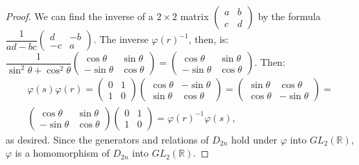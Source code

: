 \documentclass{article}
\begin{document}
\begin{enumerate}[label=(\alph*)]
\begin{proof}
            We can find the inverse of a $2 \times 2$ matrix $\begin{pmatrix}a & b \\ c & d\end{pmatrix}$ by the formula \newline $\dfrac{1}{ad - bc}\begin{pmatrix}d & -b \\ -c & a\end{pmatrix}$. The inverse $\varphi(r)^{-1}$, then, is: \newline $\dfrac{1}{\sin^2{\theta} + \cos^2{\theta}}\begin{pmatrix}\cos \theta & \sin \theta \\ -\sin \theta & \cos \theta\end{pmatrix} = \begin{pmatrix}\cos \theta & \sin \theta \\ -\sin \theta & \cos \theta\end{pmatrix}$.
            Then:
            \begin{multline*}
                \varphi(s)\varphi(r) = \begin{pmatrix}0 & 1 \\ 1 & 0\end{pmatrix}\begin{pmatrix}\cos \theta & -\sin \theta \\ \sin \theta & \cos \theta\end{pmatrix} = \begin{pmatrix}\sin \theta & \cos \theta \\ \cos \theta & -\sin \theta\end{pmatrix} = \\
                \begin{pmatrix}\cos \theta & \sin \theta \\ -\sin \theta & \cos \theta\end{pmatrix}\begin{pmatrix}0 & 1 \\ 1 & 0\end{pmatrix} = \varphi(r)^{-1} \varphi(s),
            \end{multline*}
            as desired. Since the generators and relations of $D_{2n}$ hold under $\varphi$ into $GL_2(\mathbb{R})$, $\varphi$ is a homomorphism of $D_{2n}$ into $GL_2(\mathbb{R})$.
          \end{proof}
\end{enumerate}
\end{document}
